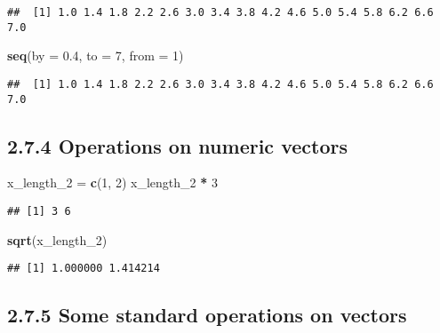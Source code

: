 \documentclass[]{article}
\newenvironment{Shaded}{\begin{snugshade}}{\end{snugshade}}
\newcommand{\DataTypeTok}[1]{\textcolor[rgb]{0.13,0.29,0.53}{#1}}
\newcommand{\DecValTok}[1]{\textcolor[rgb]{0.00,0.00,0.81}{#1}}
\newcommand{\FloatTok}[1]{\textcolor[rgb]{0.00,0.00,0.81}{#1}}
\newcommand{\KeywordTok}[1]{\textcolor[rgb]{0.13,0.29,0.53}{\textbf{#1}}}
\newcommand{\NormalTok}[1]{#1}
\newcommand{\OperatorTok}[1]{\textcolor[rgb]{0.81,0.36,0.00}{\textbf{#1}}}
\newcommand{\StringTok}[1]{\textcolor[rgb]{0.31,0.60,0.02}{#1}}
\begin{document}
\begin{verbatim}
##  [1] 1.0 1.4 1.8 2.2 2.6 3.0 3.4 3.8 4.2 4.6 5.0 5.4 5.8 6.2 6.6 7.0
\end{verbatim}

\begin{Shaded}
\begin{Highlighting}[]
\KeywordTok{seq}\NormalTok{(}\DataTypeTok{by =} \FloatTok{0.4}\NormalTok{, }\DataTypeTok{to =} \DecValTok{7}\NormalTok{, }\DataTypeTok{from =} \DecValTok{1}\NormalTok{)}
\end{Highlighting}
\end{Shaded}

\begin{verbatim}
##  [1] 1.0 1.4 1.8 2.2 2.6 3.0 3.4 3.8 4.2 4.6 5.0 5.4 5.8 6.2 6.6 7.0
\end{verbatim}

\hypertarget{operations-on-numeric-vectors}{%
\subsection{2.7.4 Operations on numeric
vectors}\label{operations-on-numeric-vectors}}

\begin{Shaded}
\begin{Highlighting}[]
\NormalTok{x_length_}\DecValTok{2}\NormalTok{ =}\StringTok{ }\KeywordTok{c}\NormalTok{(}\DecValTok{1}\NormalTok{, }\DecValTok{2}\NormalTok{) }
\NormalTok{x_length_}\DecValTok{2} \OperatorTok{*}\StringTok{ }\DecValTok{3}
\end{Highlighting}
\end{Shaded}

\begin{verbatim}
## [1] 3 6
\end{verbatim}

\begin{Shaded}
\begin{Highlighting}[]
\KeywordTok{sqrt}\NormalTok{(x_length_}\DecValTok{2}\NormalTok{)}
\end{Highlighting}
\end{Shaded}

\begin{verbatim}
## [1] 1.000000 1.414214
\end{verbatim}

\hypertarget{some-standard-operations-on-vectors}{%
\subsection{2.7.5 Some standard operations on
vectors}\label{some-standard-operations-on-vectors}}
\end{document}
